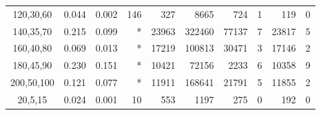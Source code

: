 \documentclass[smallextended]{svjour3hack}       %
\begin{document}
\begin{table}[!ht]
\begin{tabular}{c|r|r|r|r|r|r|r|rr}
120,30,60           & 0.044                                     & 0.002                                & 146                                         & 327                                       & 8665                                     & 724                                       & 1                                       & 119                                       & 0                                         \\
140,35,70           & 0.215                                     & 0.099                                & *                                           & 23963                                     & 322460                                   & 77137                                     & 7                                       & 23817                                     & 5                                         \\
160,40,80           & 0.069                                     & 0.013                                & *                                           & 17219                                     & 100813                                   & 30471                                     & 3                                       & 17146                                     & 2                                         \\
180,45,90           & 0.230                                     & 0.151                                & *                                           & 10421                                     & 72156                                    & 2233                                      & 6                                       & 10358                                     & 9                                         \\
200,50,100          & 0.121                                     & 0.077                                & *                                           & 11911                                     & 168641                                   & 21791                                     & 5                                       & 11855                                     & 2   \\
\hline
20,5,15             & 0.024                                     & 0.001                                & 10                                          & 553                                       & 1197                                     & 275                                       & 0                                       & 192                                       & 0                                         \\

\end{tabular}
\end{table}
\end{document}
